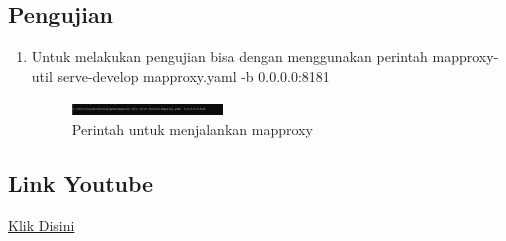 \subsection{Pengujian}
\begin{enumerate}
    \item Untuk melakukan pengujian bisa dengan menggunakan perintah mapproxy-util serve-develop mapproxy.yaml -b 0.0.0.0:8181
    \hfill\break
    \begin{figure}[H]
		\includegraphics[width=4cm]{figures/1174051/5/17.png}
		\centering
		\caption{Perintah untuk menjalankan mapproxy}
    \end{figure}
\end{enumerate}
\subsection{Link Youtube}
\href{https://www.youtube.com/watch?v=pC5HCwQ0atE&feature=youtu.be}{Klik Disini}